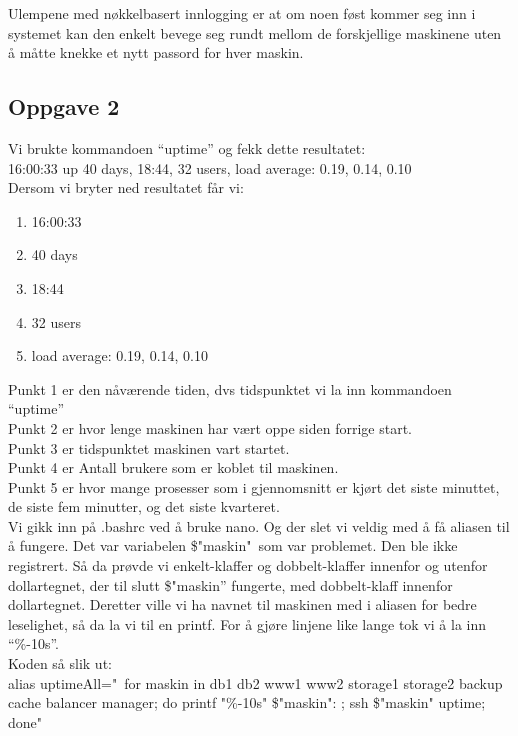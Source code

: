 \documentclass[a4paper, norsk, 12pt]{article}
\begin{document}
Ulempene med nøkkelbasert innlogging er at om noen føst kommer seg inn i systemet kan den enkelt bevege seg rundt mellom de forskjellige maskinene uten å måtte knekke et nytt passord for hver maskin.

\subsection{Oppgave 2}
Vi brukte kommandoen “uptime” og fekk dette resultatet:\\
16:00:33 up 40 days, 18:44, 32 users,  load average: 0.19, 0.14, 0.10\\

Dersom vi bryter ned resultatet får vi:\\
\begin{enumerate}
\item 16:00:33
\item 40 days
\item 18:44
\item 32 users
\item load average: 0.19, 0.14, 0.10
\end{enumerate}

Punkt 1 er den nåværende tiden, dvs tidspunktet vi la inn kommandoen “uptime”\\
Punkt 2 er hvor lenge maskinen har vært oppe siden forrige start.\\
Punkt 3 er tidspunktet maskinen vart startet.\\
Punkt 4 er Antall brukere som er koblet til maskinen.\\
Punkt 5 er hvor mange prosesser som i gjennomsnitt er kjørt det siste minuttet, de siste fem minutter, og det siste kvarteret.\\


Vi gikk inn på .bashrc ved å bruke nano. Og der slet vi veldig med å få aliasen til å fungere. Det var variabelen \$"maskin"\ som var problemet. Den ble ikke registrert. Så da prøvde vi enkelt-klaffer og dobbelt-klaffer innenfor og utenfor dollartegnet, der til slutt \$"maskin” fungerte, med dobbelt-klaff innenfor dollartegnet. Deretter ville vi ha navnet til maskinen med i aliasen for bedre leselighet, så da la vi til en printf. For å gjøre linjene like lange tok vi å la inn “\%-10s”. \\

Koden så slik ut:\\
alias uptimeAll="\ for maskin in db1 db2 www1 www2 storage1 storage2 backup cache balancer manager; do printf "\%-10s" \$"maskin": ;  ssh \$"maskin" uptime; done"\\
\end{document}
